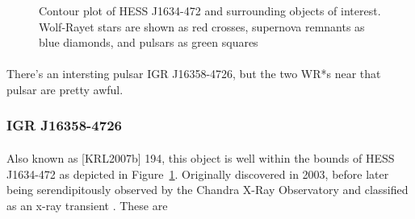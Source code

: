 \documentclass[a4paper, titlepage, oneside]{article}
\begin{document}
\begin{multicols}{2}
\begin{figure}[H]
  \centering
  \caption{Contour plot of HESS J1634-472 and surrounding objects of interest. Wolf-Rayet stars are shown as red crosses, supernova remnants as blue diamonds, and pulsars as green squares}
  \label{fig:hess34}
\end{figure}

\paragraph{}
There's an intersting pulsar IGR J16358-4726, but the two WR*s near that pulsar are pretty awful.

\subsubsection{IGR J16358-4726}
\paragraph{}
Also known as [KRL2007b] 194, this object is well within the bounds of HESS J1634-472 as depicted in Figure~\ref{fig:hess34}. Originally discovered in 2003, before later being serendipitously observed by the Chandra X-Ray Observatory and classified as an x-ray transient \parencite{Patel:2004}. These are


\end{multicols}
\end{document}
